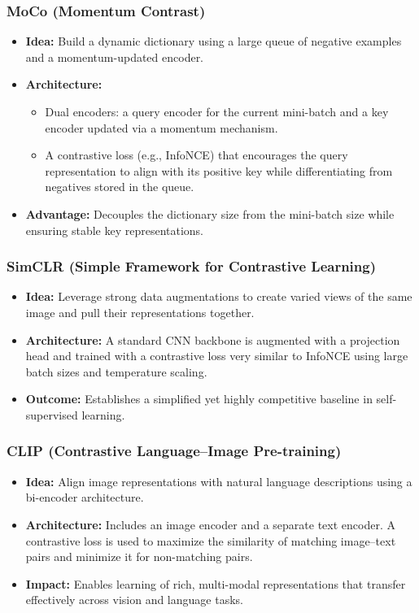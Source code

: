 \documentclass{article}
\begin{document}
\subsubsection{MoCo (Momentum Contrast)}
\begin{itemize}
    \item \textbf{Idea:} Build a dynamic dictionary using a large queue of negative examples and a momentum-updated encoder.
    \item \textbf{Architecture:} 
    \begin{itemize}
        \item Dual encoders: a query encoder for the current mini-batch and a key encoder updated via a momentum mechanism.
        \item A contrastive loss (e.g., InfoNCE) that encourages the query representation to align with its positive key while differentiating from negatives stored in the queue.
    \end{itemize}
    \item \textbf{Advantage:} Decouples the dictionary size from the mini-batch size while ensuring stable key representations.
\end{itemize}

\subsubsection{SimCLR (Simple Framework for Contrastive Learning)}
\begin{itemize}
    \item \textbf{Idea:} Leverage strong data augmentations to create varied views of the same image and pull their representations together.
    \item \textbf{Architecture:} A standard CNN backbone is augmented with a projection head and trained with a contrastive loss very similar to InfoNCE using large batch sizes and temperature scaling.
    \item \textbf{Outcome:} Establishes a simplified yet highly competitive baseline in self-supervised learning.
\end{itemize}

\subsubsection{CLIP (Contrastive Language–Image Pre-training)}
\begin{itemize}
    \item \textbf{Idea:} Align image representations with natural language descriptions using a bi-encoder architecture.
    \item \textbf{Architecture:} Includes an image encoder and a separate text encoder. A contrastive loss is used to maximize the similarity of matching image--text pairs and minimize it for non-matching pairs.
    \item \textbf{Impact:} Enables learning of rich, multi-modal representations that transfer effectively across vision and language tasks.
\end{itemize}
\end{document}
